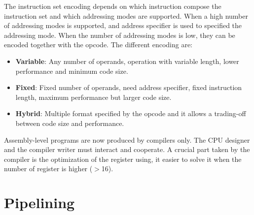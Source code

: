 \documentclass[12pt]{article}
\begin{document}
The instruction set encoding depends on which instruction compose the instruction set and which addressing modes are supported. When a high number of addressing modes is supported, and address specifier is used to specified the addressing mode. When the number of addressing modes is low, they can be encoded together with the opcode. The different encoding are:
\begin{itemize}
  \item \textbf{Variable}: Any number of operands, operation with variable length, lower performance and minimum code size.
  \item \textbf{Fixed}: Fixed number of operands, need address specifier, fixed instruction length, maximum performance but larger code size.
  \item \textbf{Hybrid}: Multiple format specified by the opcode and it allows a trading-off between code size and performance.
\end{itemize}

Assembly-level programs are now produced by compilers only. The CPU designer and the compiler writer must interact and cooperate. A crucial part taken by the compiler is the optimization of the register using, it easier to solve it when the number of register is higher ($>$16).

\section{Pipelining}
\end{document}
